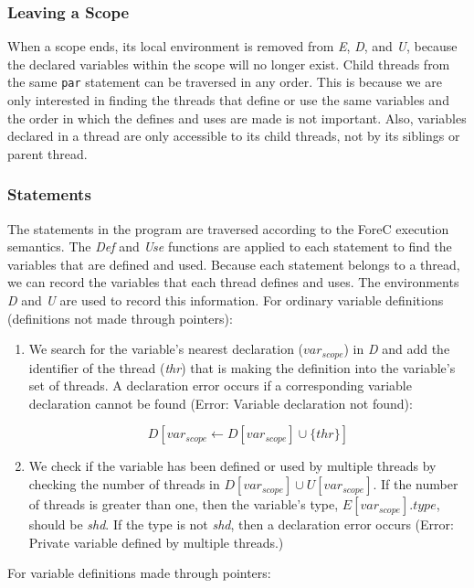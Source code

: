 \subsubsection{Leaving a Scope}
When a scope ends, its local environment is removed from \emph{E}, 
\emph{D}, and \emph{U}, because the declared variables within the 
scope will no longer exist. Child threads from the same \verb$par$ 
statement can be traversed in any order. This is because we are 
only interested in finding the threads that define or use the same 
variables and the order in which the defines and uses are made is 
not important. Also, variables declared in a thread are only accessible 
to its child threads, not by its siblings or parent thread. 

\subsubsection{Statements}
The statements in the program are traversed according to the ForeC 
execution semantics. The \emph{Def} and \emph{Use} functions are 
applied to each statement to find the variables that are defined and 
used. Because each statement belongs to a thread, we can record the 
variables that each thread defines and uses. The environments \emph{D} 
and \emph{U} are used to record this information.
For ordinary variable definitions (definitions not made through pointers):

\begin{enumerate}
	\item We search for the variable's nearest declaration ($var_{scope}$) 
		  in \emph{D} and add the identifier of the thread (\emph{thr}) that
		  is making the definition into the variable's set of threads. A 
		  declaration error occurs if a corresponding variable declaration 
		  cannot be found (Error: Variable declaration not found): 
		  
		  \begin{equation*}
		  	D[var_{scope} \gets D[var_{scope}] \cup \{thr\}]
		  \end{equation*}
		  
	\item We check if the variable has been defined or used by multiple 
		  threads by checking the number of threads in $D[var_{scope}] \cup U[var_{scope}]$. 
		  If the number of threads is greater than one, then the variable's type, 
		  $E[var_{scope}].type$, should be \emph{shd}. If the type is not \emph{shd}, 
		  then a declaration error occurs (Error: Private variable defined by multiple threads.)
\end{enumerate}
For variable definitions made through pointers:

